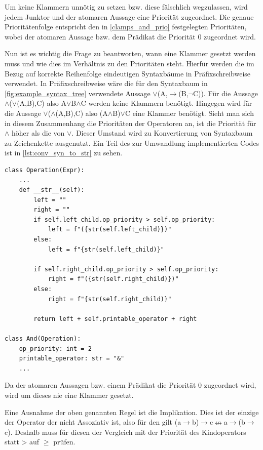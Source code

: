 Um keine Klammern unnötig zu setzen bzw. diese fälschlich wegzulassen, wird jedem Junktor und der atomaren Aussage eine Priorität zugeordnet. Die genaue Prioritätenfolge entspricht den in \autoref{clamps_and_prio} festgelegten Prioritäten, wobei der atomaren Aussage bzw. dem Prädikat die Priorität 0 zugeordnet wird.

Nun ist es wichtig die Frage zu beantworten, wann eine Klammer gesetzt werden muss und wie dies im Verhältnis zu den Prioritäten steht. Hierfür werden die im Bezug auf korrekte Reihenfolge eindeutigen Syntaxbäume in Präfixschreibweise verwendet. In Präfixschreibweise wäre die für den Syntaxbaum in \autoref{fig:example_syntax_tree} verwendete Aussage $\vee$(A,$\rightarrow$(B,$\neg$C)). Für die Aussage $\wedge$($\vee$(A,B),C) also A$\vee$B$\wedge$C werden keine Klammern benötigt. Hingegen wird für die Aussage  $\vee$($\wedge$(A,B),C) also (A$\wedge$B)$\vee$C eine Klammer benötigt. Sieht man sich in diesem Zusammenhang die Prioritäten der Operatoren an, ist die Priorität für $\wedge$ höher als die von $\vee$. Dieser Umstand wird zu Konvertierung von Syntaxbaum zu Zeichenkette ausgenutzt. Ein Teil des zur Umwandlung implementierten Codes ist in \autoref{lst:conv_syn_to_str} zu sehen.

\begin{lstlisting}[caption={Umwandlung von Syntaxbaum zu Zeichenkette},label=lst:conv_syn_to_str]
class Operation(Expr):
	...
	def __str__(self):
		left = ""
		right = ""
		if self.left_child.op_priority > self.op_priority:
			left = f"({str(self.left_child)})"
		else:
			left = f"{str(self.left_child)}"
      	
      	if self.right_child.op_priority > self.op_priority:
			right = f"({str(self.right_child)})"
		else:
			right = f"{str(self.right_child)}"
		
		return left + self.printable_operator + right

class And(Operation):
	op_priority: int = 2
	printable_operator: str = "&"
	...
\end{lstlisting}

Da der atomaren Aussagen bzw. einem Prädikat die Priorität 0 zugeordnet wird, wird um dieses nie eine Klammer gesetzt.

Eine Ausnahme der oben genannten Regel ist die Implikation. Dies ist der einzige der Operator der nicht Assoziativ ist, also für den gilt (a$\rightarrow$b)$\rightarrow$c$\nleftrightarrow$a$\rightarrow$(b$\rightarrow$c). Deshalb muss für diesen der Vergleich mit der Priorität des Kindoperators statt > auf $\geq$ prüfen.

